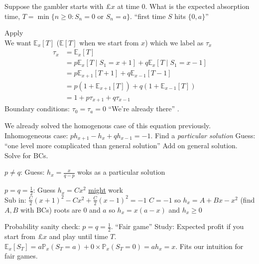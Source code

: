 \begin{question}
    Suppose the gambler starts with $\pounds x$ at time $0$.
    What is the expected absorption time, $T = \min \{ n \geq 0 : S_n = 0 \text{ or } S_n = a\}$. \color{blue} ``first time $S$ hits $\{0, a\}$'' \color{black}
\end{question} 

\begin{answer}
    Apply \\
    We want $\mathbb{E}_x[T]$ ($\mathbb{E}[T]$ when we start from $x$) which we label as $\tau_x$
    \begin{align*}
        \tau_x &= \mathbb{E}_x[T] \\
        &= p \mathbb{E}_x[T \mid S_1 = x + 1] + q \mathbb{E}_x[T \mid S_1 = x - 1] \\
        &= p \mathbb{E}_{x + 1}[T + 1] + q \mathbb{E}_{x - 1}[T - 1] \\
        &= p (1 + \mathbb{E}_{x + 1}[T]) + q(1 + \mathbb{E}_{x - 1}[T]) \\
        &= 1 + p \tau_{x + 1} + q \tau_{x - 1}
    \end{align*} 
    Boundary conditions: $\tau_0 = \tau_a = 0$ \color{blue} ``We're already there'' \color{black}.

    We already solved the homogenous case of this equation previously. 
    Inhomogeneous case: $p h_{x + 1} - h_x + q h_{x - 1} = -1$.
    Find a \emph{particular solution} \color{blue} Guess: ``one level more complicated than general solution'' \color{black}
    Add on general solution.
    Solve for BCs.

    $p \neq q$: Guess: $h_x = \frac{x}{q - p}$ woks as a particular solution

    $p = q = \frac{1}{2}$: Guess $h_x = C x^2$ \underline{might} work \\
    Sub in: $\frac{C}{2} (x + 1)^2 - C x^2 + \frac{C}{2} (x - 1)^2 = - 1$
    $C = -1$ so $h_x = A + Bx - x^2$ (find $A, B$ with BCs)
    roots are $0$ and $a$ so $h_x = x (a - x)$ and $h_x \geq 0$

    \color{blue}
    Probability sanity check: $p = q = \frac{1}{2}$. ``Fair game''
    Study: Expected profit if you start from $\pounds x$ and play until time $T$.
    $\mathbb{E}_x[S_T] = a \mathbb{P}_x(S_T = a) + 0 \times \mathbb{P}_x(S_T = 0) = a h_x = x$.
    Fits our intuition for fair games. \checkmark
    \color{black}
\end{answer} 